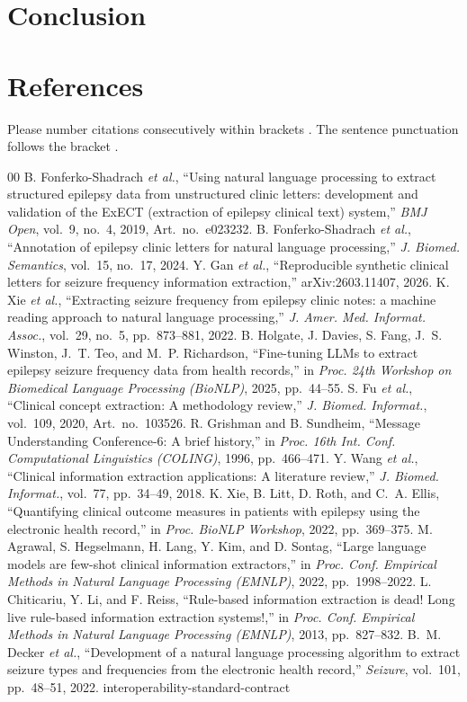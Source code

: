 \documentclass[conference]{IEEEtran}
\begin{document}
\section{Conclusion}


\section*{References}

Please number citations consecutively within brackets \cite{b1}. The 
sentence punctuation follows the bracket \cite{b2}. 

\begin{thebibliography}{00}
 B. Fonferko-Shadrach \emph{et al.}, ``Using natural language processing to extract structured epilepsy data from unstructured clinic letters: development and validation of the ExECT (extraction of epilepsy clinical text) system,'' \emph{BMJ Open}, vol.~9, no.~4, 2019, Art.~no.~e023232.
 B. Fonferko-Shadrach \emph{et al.}, ``Annotation of epilepsy clinic letters for natural language processing,'' \emph{J. Biomed. Semantics}, vol.~15, no.~17, 2024.
 Y. Gan \emph{et al.}, ``Reproducible synthetic clinical letters for seizure frequency information extraction,'' arXiv:2603.11407, 2026.
 K. Xie \emph{et al.}, ``Extracting seizure frequency from epilepsy clinic notes: a machine reading approach to natural language processing,'' \emph{J. Amer. Med. Informat. Assoc.}, vol.~29, no.~5, pp.~873--881, 2022.
 B. Holgate, J. Davies, S. Fang, J.~S. Winston, J.~T. Teo, and M.~P. Richardson, ``Fine-tuning LLMs to extract epilepsy seizure frequency data from health records,'' in \emph{Proc. 24th Workshop on Biomedical Language Processing (BioNLP)}, 2025, pp.~44--55.
 S. Fu \emph{et al.}, ``Clinical concept extraction: A methodology review,'' \emph{J. Biomed. Informat.}, vol.~109, 2020, Art.~no.~103526.
 R. Grishman and B. Sundheim, ``Message Understanding Conference-6: A brief history,'' in \emph{Proc. 16th Int. Conf. Computational Linguistics (COLING)}, 1996, pp.~466--471.
 Y. Wang \emph{et al.}, ``Clinical information extraction applications: A literature review,'' \emph{J. Biomed. Informat.}, vol.~77, pp.~34--49, 2018.
 K. Xie, B. Litt, D. Roth, and C.~A. Ellis, ``Quantifying clinical outcome measures in patients with epilepsy using the electronic health record,'' in \emph{Proc. BioNLP Workshop}, 2022, pp.~369--375.
 M. Agrawal, S. Hegselmann, H. Lang, Y. Kim, and D. Sontag, ``Large language models are few-shot clinical information extractors,'' in \emph{Proc. Conf. Empirical Methods in Natural Language Processing (EMNLP)}, 2022, pp.~1998--2022.
 L. Chiticariu, Y. Li, and F. Reiss, ``Rule-based information extraction is dead! Long live rule-based information extraction systems!,'' in \emph{Proc. Conf. Empirical Methods in Natural Language Processing (EMNLP)}, 2013, pp.~827--832.
 B.~M. Decker \emph{et al.}, ``Development of a natural language processing algorithm to extract seizure types and frequencies from the electronic health record,'' \emph{Seizure}, vol.~101, pp.~48--51, 2022.
 interoperability-standard-contract
\end{thebibliography}

\vspace{12pt}
\end{document}
